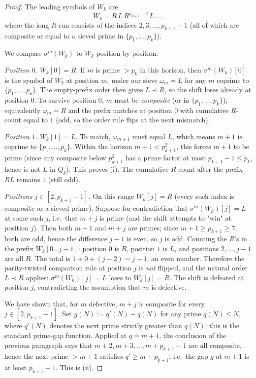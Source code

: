 \documentclass{iopjournal}
\theoremstyle{definition}
\begin{document}
\begin{proof}
The leading symbols of $W_k$ are
\[
    W_k = R\, L\, R^{p_{k+1} - 2}\, L\, \ldots,
\]
where the long $R$-run consists of the indices $2, 3, \ldots, p_{k+1} - 1$
(all of which are composite or equal to a sieved prime in $\{p_1, \ldots, p_k\}$).

We compare $\sigma^m(W_k)$ to $W_k$ position by position.

\emph{Position $0$.} $W_k[0] = R$. If $m$ is prime $> p_k$ in this
horizon, then $\sigma^m(W_k)[0]$ is the symbol of $W_k$ at position $m$;
under our sieve $\omega_m = L$ for any $m$ coprime to $\{p_1, \ldots, p_k\}$.
The empty-prefix order then gives $L \prec R$, so the shift loses
already at position $0$. To survive position $0$, $m$ must be
\emph{composite} (or in $\{p_1, \ldots, p_k\}$); equivalently
$\omega_m = R$ and the prefix matches at position $0$ with cumulative
$R$-count equal to $1$ (odd, so the order rule flips at the next
mismatch).

\emph{Position $1$.} $W_k[1] = L$. To match, $\omega_{m+1}$ must equal
$L$, which means $m + 1$ is coprime to $\{p_1, \ldots, p_k\}$. Within
the horizon $m + 1 < p_{k+1}^2$, this forces $m + 1$ to be prime (since
any composite below $p_{k+1}^2$ has a prime factor at most
$p_{k+1} - 1 \leq p_k$, hence is not $L$ in $Q_k$). This proves (i).
The cumulative $R$-count after the prefix $RL$ remains $1$ (still odd).

\emph{Positions $j \in [2, p_{k+1} - 1]$.} On this range $W_k[j] = R$
(every such index is composite or a sieved prime). Suppose for
contradiction that $\sigma^m(W_k)[j] = L$ at some such $j$, i.e.\ that
$m + j$ is prime (and the shift attempts to "win" at position $j$).
Then both $m + 1$ and $m + j$ are primes; since $m + 1 \geq p_{k+1} \geq 7$,
both are odd, hence the difference $j - 1$ is even, so $j$ is odd.
Counting the $R$'s in the prefix $W_k[0\ldots j-1]$: position $0$ is
$R$, position $1$ is $L$, and positions $2, \ldots, j-1$ are all $R$.
The total is $1 + 0 + (j - 2) = j - 1$, an even number. Therefore the
parity-twisted comparison rule at position $j$ is \emph{not} flipped,
and the natural order $L \prec R$ applies: $\sigma^m(W_k)[j] = L$ loses
to $W_k[j] = R$. The shift is defeated at position $j$, contradicting
the assumption that $m$ is defective.

We have shown that, for $m$ defective, $m + j$ is composite for every
$j \in [2, p_{k+1} - 1]$. Set $g(N) := q'(N) - q(N)$ for any prime
$q(N) \leq N$, where $q'(N)$ denotes the next prime strictly greater
than $q(N)$; this is the standard prime-gap function. Applied at
$q = m + 1$, the conclusion of the previous paragraph says that
$m + 2, m + 3, \ldots, m + p_{k+1} - 1$ are all composite, hence the
next prime $> m + 1$ satisfies $q' \geq m + p_{k+1}$, i.e.\ the gap
$g$ at $m + 1$ is at least $p_{k+1} - 1$. This is (ii).
\end{proof}
\end{document}

